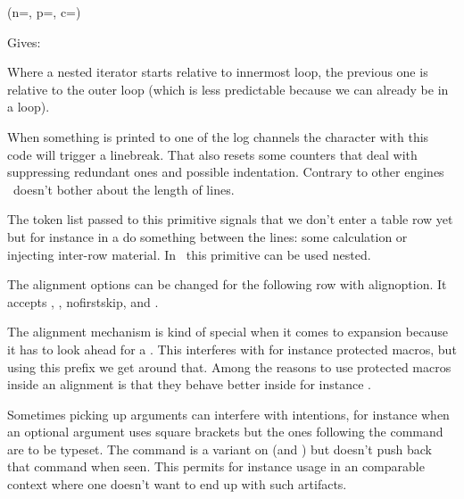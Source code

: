 \startbuffer
{} {%
     {%
        (n=\the{},
         p=\the{},
         c=\the\currentloopiterator)
    }%
}%
\stopbuffer

\typebuffer

Gives:

\getbuffer

Where a nested iterator starts relative to innermost loop, the previous one is
relative to the outer loop (which is less predictable because we can already be
in a loop).

\stopnewprimitive

\startoldprimitive[title={\prm {newlinechar}}]

When something is printed to one of the log channels the character with this code
will trigger a linebreak. That also resets some counters that deal with
suppressing redundant ones and possible indentation. Contrary to other engines
\LUAMETATEX\ doesn't bother about the length of lines.

\stopoldprimitive

\startoldprimitive[title={\prm {noalign}}]

The token list passed to this primitive signals that we don't enter a table row
yet but for instance in a  do something between the lines: some
calculation or injecting inter-row material. In \LUAMETATEX\ this primitive can
be used nested.

The alignment options can be changed for the following row with \prm
{alignoption}. It accepts , , \type
{nofirstskip},  and .

\stopoldprimitive

\startnewprimitive[title={\prm {noaligned}}]

The alignment mechanism is kind of special when it comes to expansion because it
has to look ahead for a . This interferes with for instance
protected macros, but using this prefix we get around that. Among the reasons to
use protected macros inside an alignment is that they behave better inside for
instance .

\stopnewprimitive

\startnewprimitive[title={\prm {noarguments}}]

Sometimes picking up arguments can interfere with intentions, for instance when
an optional argument uses square brackets but the ones following the command are
to be typeset. The  command is a variant on  (and
) but doesn't push back that command when seen. This permits for
instance usage in an  comparable context where one doesn't want to end
up with such artifacts.

